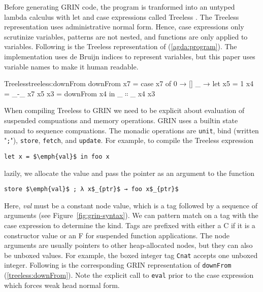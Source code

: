 \documentclass[9pt, twocolumn]{article}
\newcommand{\refp}[1]{(\ref{#1})}
\begin{document}
Before generating GRIN code, the program is tranformed into an untyped lambda calculus with let and case expressions called Treeless \citep{hausmann2015}.
The Treeless representation uses administrative normal form. 
Hence, case expressions only scrutinize variables, patterns are not nested, and functions are only applied to variables.
Following is the Treeless representation of  \refp{agda:program}.
The implementation uses de Bruijn indices to represent variables, but this paper uses variable names to make it \mbox{human} readable. 

\begin{typewriter}{Treeless}{treeless:downFrom}
downFrom x7 = case x7 of
  0 → []
  _ → let x5 = 1
          x4 = _-_ x7 x5
          x3 = downFrom x4 in 
      _$∷$_ x4 x3
\end{typewriter}


When compiling Treeless to GRIN we need to be explicit about evaluation of suspended compuations and memory operations.
GRIN uses a builtin state monad to sequence compuations. 
The monadic operations are \lstinline{unit}, bind (written "\lstinline{;}"), \lstinline{store}, \lstinline{fetch}, and \lstinline{update}. 
For example, to compile the Treeless expression
\begin{lstlisting}[language=Treeless, xleftmargin=1em]
let x = $\emph{val}$ in foo x
\end{lstlisting}
lazily, we allocate the value and pass the pointer as an argument to the function
\begin{lstlisting}[language=GRIN, xleftmargin=1em]
store $\emph{val}$ ; λ x$_{ptr}$ → foo x$_{ptr}$
\end{lstlisting}
Here, \emph{val} must be a constant node value, which is a tag followed by a sequence of arguments (see \mbox{Figure \ref{fig:grin-syntax}}). 
We can pattern match on a tag with the case expression to determine the kind.
Tags are prefixed with either a C if it is a constructor value or an F for suspended function applications.
The node arguments are usually pointers to other heap-allocated nodes, but they can also be unboxed values.
For example, the boxed integer tag \lstinline{Cnat} accepts one unboxed integer.
Following is the corresponding GRIN representation of \lstinline{downFrom} \refp{treeless:downFrom}.
Note the explicit call to \lstinline{eval} prior to the case expression which forces weak head normal form.
\end{document}

